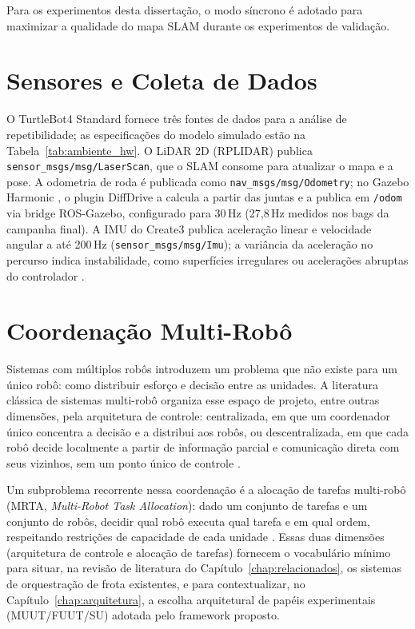 Para os experimentos desta dissertação, o modo síncrono é adotado para maximizar
a qualidade do mapa SLAM durante os experimentos de validação.

\section{Sensores e Coleta de Dados}
\label{sec:sensores}

O TurtleBot4 Standard fornece três fontes de dados para a análise de
repetibilidade; as especificações do modelo simulado estão na
Tabela~\ref{tab:ambiente_hw}. O LiDAR 2D (RPLIDAR) publica
\texttt{sensor\_\allowbreak msgs/\allowbreak msg/\allowbreak LaserScan}, que o
SLAM consome para atualizar o mapa e a pose. A odometria de roda é publicada
como \texttt{nav\_\allowbreak msgs/\allowbreak msg/\allowbreak Odometry}; no
Gazebo Harmonic \cite{koenig2004gazebo}, o plugin DiffDrive a calcula a partir
das juntas e a publica em \texttt{/\allowbreak odom} via bridge ROS-Gazebo,
configurado para 30\,Hz (27,8\,Hz medidos nos bags da campanha final). A IMU
do Create3 publica aceleração linear e velocidade angular a até 200\,Hz
(\texttt{sensor\_\allowbreak msgs/\allowbreak msg/\allowbreak Imu}); a variância
da aceleração no percurso indica instabilidade, como superfícies irregulares ou
acelerações abruptas do controlador \cite{siegwart2011}.

\section{Coordenação Multi-Robô}
\label{sec:coordenacao_multirrobo}

Sistemas com múltiplos robôs introduzem um problema que não existe para um único
robô: como distribuir esforço e decisão entre as unidades. A literatura clássica
de sistemas multi-robô organiza esse espaço de projeto, entre outras dimensões,
pela arquitetura de controle: centralizada, em que um coordenador único
concentra a decisão e a distribui aos robôs, ou descentralizada, em que cada
robô decide localmente a partir de informação parcial e comunicação direta com
seus vizinhos, sem um ponto único de controle \cite{farinelli2004}.

Um subproblema recorrente nessa coordenação é a alocação de tarefas multi-robô
(MRTA, \textit{Multi-Robot Task Allocation}): dado um conjunto de tarefas e um
conjunto de robôs, decidir qual robô executa qual tarefa e em qual ordem,
respeitando restrições de capacidade de cada unidade \cite{gerkey2004}. Essas
duas dimensões (arquitetura de controle e alocação de tarefas) fornecem o
vocabulário mínimo para situar, na revisão de literatura do
Capítulo~\ref{chap:relacionados}, os sistemas de orquestração de frota
existentes, e para contextualizar, no Capítulo~\ref{chap:arquitetura}, a
escolha arquitetural de papéis experimentais (MUUT/FUUT/SU) adotada pelo
framework proposto.


